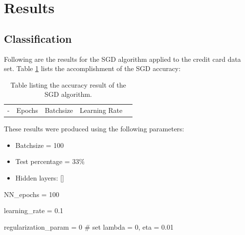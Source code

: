\section{Results}
    \subsection{Classification}
		Following are the results for the SGD algorithm applied to the credit card data set. Table \ref{tab:sgdresults} lists the accomplishment of the SGD accuracy:
		\begin{table}[H]
			\centering
			\begin{tabular}[t]{lcccc} %
				\toprule
				- & Epochs & Batchsize & Learning Rate &
				\bottomrule
			\end{tabular}
			\caption{Table listing the accuracy result of the SGD algorithm.}
			\label{tab:sgdresults}
		\end{table}
		These results were produced using the following parameters:
		\begin{itemize}
			\item Batchsize = 100
			\item Test percentage = $33\%$
			\item Hidden layers: []
		\end{itemize}
		
		
		
		
		
	
		NN_epochs = 100
		
		learning_rate = 0.1
		
		regularization_param = 0         # set lambda = 0, eta = 0.01
		
